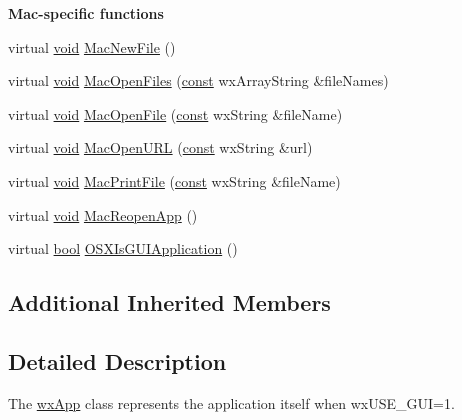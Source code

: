 \begin{Indent}{\bf Mac-\/specific functions}\par
\begin{DoxyCompactItemize}
\item 
virtual \hyperlink{sound_8c_ae35f5844602719cf66324f4de2a658b3}{void} \hyperlink{classwx_app_adfccb56471d139a0bb29e96c3c6d12fa}{Mac\+New\+File} ()
\item 
virtual \hyperlink{sound_8c_ae35f5844602719cf66324f4de2a658b3}{void} \hyperlink{classwx_app_a0cf8d83fc9e1a7b7f911f29f05127d24}{Mac\+Open\+Files} (\hyperlink{getopt1_8c_a2c212835823e3c54a8ab6d95c652660e}{const} wx\+Array\+String \&file\+Names)
\item 
virtual \hyperlink{sound_8c_ae35f5844602719cf66324f4de2a658b3}{void} \hyperlink{classwx_app_a420a1cef557cfe2edaee6ffdaaa5f7fb}{Mac\+Open\+File} (\hyperlink{getopt1_8c_a2c212835823e3c54a8ab6d95c652660e}{const} wx\+String \&file\+Name)
\item 
virtual \hyperlink{sound_8c_ae35f5844602719cf66324f4de2a658b3}{void} \hyperlink{classwx_app_a2c0ab6480ef6113488a5847a79044ac7}{Mac\+Open\+U\+RL} (\hyperlink{getopt1_8c_a2c212835823e3c54a8ab6d95c652660e}{const} wx\+String \&url)
\item 
virtual \hyperlink{sound_8c_ae35f5844602719cf66324f4de2a658b3}{void} \hyperlink{classwx_app_a1f6e5bc7e119f4394fddae1782acd047}{Mac\+Print\+File} (\hyperlink{getopt1_8c_a2c212835823e3c54a8ab6d95c652660e}{const} wx\+String \&file\+Name)
\item 
virtual \hyperlink{sound_8c_ae35f5844602719cf66324f4de2a658b3}{void} \hyperlink{classwx_app_a2054c2fadff9170b91e474eb02c83227}{Mac\+Reopen\+App} ()
\item 
virtual \hyperlink{mac_2config_2i386_2lib-src_2libsoxr_2soxr-config_8h_abb452686968e48b67397da5f97445f5b}{bool} \hyperlink{classwx_app_ad50789f1fe18722d1ec17a7b30827790}{O\+S\+X\+Is\+G\+U\+I\+Application} ()
\end{DoxyCompactItemize}
\end{Indent}
\subsection*{Additional Inherited Members}


\subsection{Detailed Description}
The \hyperlink{classwx_app}{wx\+App} class represents the application itself when {\ttfamily wx\+U\+S\+E\+\_\+\+G\+UI=1}.

